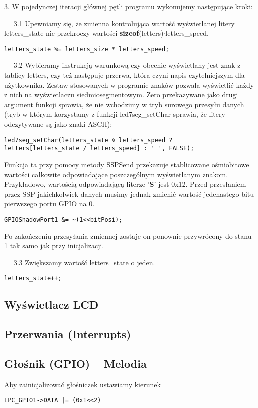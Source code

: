 \documentclass[a4paper,12pt,twoside]{article}
\theoremstyle{plain}
\theoremstyle{definition}
\theoremstyle{remark}
\begin{document}
3. W pojedynczej iteracji głównej pętli programu wykonujemy następujące kroki:

$\quad$ 3.1 Upewniamy się, że zmienna kontrolująca wartość wyświetlanej litery letters\_state nie przekroczy wartości \textbf{sizeof}(letters)$\cdot$letters\_speed.
\begin{verbatim}
letters_state %= letters_size * letters_speed;
\end{verbatim}

$\quad$ 3.2 Wybieramy instrukcją warunkową czy obecnie wyświetlany jest znak z tablicy letters, czy też następuje przerwa, która czyni napis czytelniejszym dla użytkownika. Zestaw stosowanych w programie znaków pozwala wyświetlić każdy z nich na wyświetlaczu siedmiosegmentowym. Zero przekazywane jako drugi argument funkcji sprawia, że nie wchodzimy w tryb surowego przesyłu danych (tryb w którym korzystamy z funkcji led7seg\_setChar sprawia, że litery odczytywane są jako znaki ASCII):
\begin{verbatim}
led7seg_setChar(letters_state % letters_speed ?
letters[letters_state / letters_speed] : ' ', FALSE);
\end{verbatim}
Funkcja ta przy pomocy metody SSPSend przekazuje stablicowane ośmiobitowe wartości całkowite odpowiadające poszczególnym wyświetlanym znakom. Przykładowo, wartością odpowiadającą literze '\textbf{S}' jest 0x12. Przed przesłaniem przez SSP jakichkolwiek danych musimy jednak zmienić wartość jedenastego bitu pierwszego portu GPIO na 0. 
\begin{verbatim}
GPIOShadowPort1 &= ~(1<<bitPosi);
\end{verbatim}
Po zakończeniu przesyłania zmiennej zostaje on ponownie przywrócony do stanu 1 tak samo jak przy inicjalizacji.

$\quad$ 3.3 Zwiększamy wartość letters\_state o jeden.
\begin{verbatim}
letters_state++;
\end{verbatim}
\subsection{Wyświetlacz LCD}

\subsection{Przerwania (Interrupts)}

\subsection{Głośnik (GPIO) -- Melodia}
Aby zainicjalizować głośniczek ustawiamy kierunek 
\begin{verbatim}
LPC_GPIO1->DATA |= (0x1<<2)
\end{verbatim}
\end{document}
